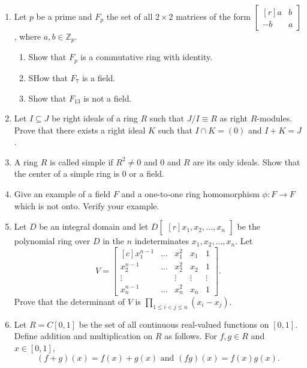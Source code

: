 \documentclass{article}
\theoremstyle{definition}
\newcommand{\Z}{\mathbb{Z}}
\newcommand{\mat}[1]{\begin{bmatrix*}[r] #1 \end{bmatrix*}}
\newcommand{\x}{\times}
\begin{document}
\begin{enumerate}
            \item Let $p$ be a prime and $F_p$ the set of all $2\x 2$ matrices of the form $\mat{a&b\\-b&a}$, where $a,b\in \Z_p$.
            
            \begin{enumerate}
                \item Show that $F_p$ is a commutative ring with identity.
                \item SHow that $F_7$ is a field.
                \item Show that $F_{13}$ is not a field.
            \end{enumerate}

            \item Let $I\subseteq J$ be right ideals of a ring $R$ such that $J/I \equiv R$ as right $R$-modules. Prove that there exists a right ideal $K$ such that $I\cap K=(0)$ and $I+K=J$.
            
            \item A ring $R$ is called simple if $R^2 \neq 0$ and $0$ and $R$ are its only ideals. Show that the center of a simple ring is $0$ or a field. 
            
            \item Give an example of a field $F$ and a one-to-one ring homomorphism $\phi : F\to F$ which is not onto. Verify your example.
            
            \item Let $D$ be an integral domain and let $D\mat{x_1, x_2, \hdots,  x_n}$ be the polynomial ring over $D$ in the $n$ indeterminates $x_1, x_2, \hdots, x_n$. Let \[V=\begin{bmatrix*}[c] x^{n-1}_1 & \hdots & x^2_1 & x_1 & 1 \\ x^{n-1}_2 & \hdots & x^2_2 & x_2 & 1 \\ \vdots & & \vdots & \vdots & \vdots \\ x^{n-1}_n & \hdots & x^2_n & x_n & 1 \end{bmatrix*}.\]  Prove that the determinant of $V$ is $\prod_{1\leq i <j \leq n} (x_i-x_j)$.
            
            \item Let $R=C[0,1]$ be the set of all continuous real-valued functions on $[0,1]$. Define addition and multiplication on $R$ as follows. For $f,g\in R$ and $x\in [0,1]$, \[(f+g)(x)=f(x)+g(x) \text{ and } (fg)(x)=f(x)g(x).\]
            

\end{enumerate}
\end{document}
